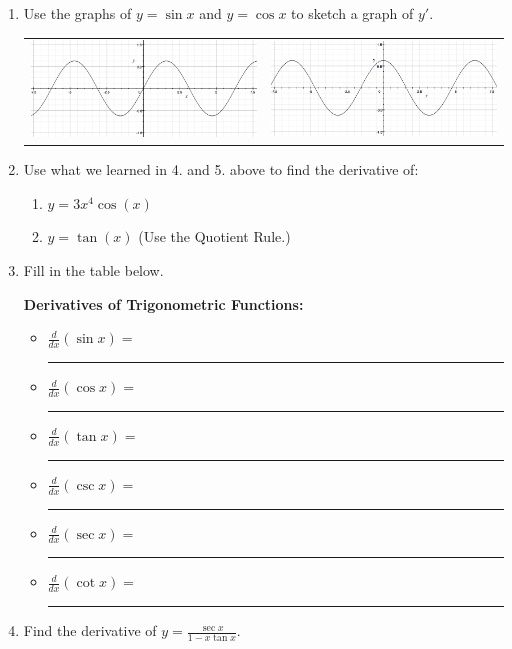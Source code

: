 \documentclass[11pt,fleqn]{article}
\begin{document}
\setlength{\parindent}{0cm}
\renewcommand{\headrulewidth}{0pt}
\newcommand{\blank}[1]{\rule{#1}{0.75pt}}
\renewcommand{\d}{\displaystyle}
\vspace*{-0.7in}
\begin{center}
 {\large{ }}
\end{center}
\begin{enumerate}
\item Use the graphs of $y = \sin x$  and $y=\cos x$ to sketch a graph of
$y'$.

\begin{tabular}{lr} 
\includegraphics[width=3in]{sinx}
&
  \includegraphics[width=3in]{cosx}
\end{tabular}
\item Use what we learned in 4. and 5. above to find the derivative of:
	\begin{enumerate}
	\item $y=3x^4 \cos(x)$
	\vspace{.5in}
	\item $y=\tan(x)$ (Use the Quotient Rule.)
	\vfill
	\end{enumerate}
	
	\item Fill in the table below. \\

\begin{framed}
  \textbf{Derivatives of Trigonometric Functions:}

\begin{multicols}{2}{
\vspace{-0.3in}
  \begin{itemize}
  \item $\frac{d}{dx} (\sin x) =$ \blank{0.85in}
  \item $\frac{d}{dx} (\cos x) = $ \blank{0.85in}
  \item $\frac{d}{dx} (\tan x) = $ \blank{0.85in}
\columnbreak
  \item $\frac{d}{dx} (\csc x) = $ \blank{0.85in}
  \item $\frac{d}{dx} (\sec x) = $ \blank{0.85in}
  \item $\frac{d}{dx} (\cot x) = $ \blank{0.85in}
  \end{itemize}}
\end{multicols}
\end{framed}
\item Find the derivative of $\displaystyle{y=\frac{\sec x}{1-x\tan x}}.$
\vfill
\newpage


\end{enumerate}
\end{document}
